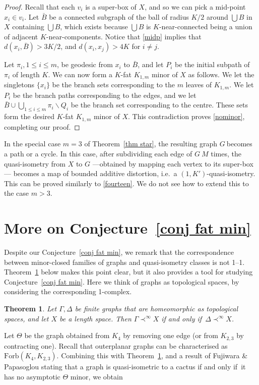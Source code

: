 \documentclass[a4paper]{article}
\newtheorem{theorem}[proposition]{Theorem}
\newcommand{\sm}{\backslash}
\newcommand{\g}{\ensuremath{G\ }}
\newcommand{\Tr}[1]{Theorem~\ref{#1}}
\newcommand{\Cnr}[1]{Con\-jecture~\ref{#1}}
\renewcommand{\iff}{if and only if}
\newcommand{\asm}[2]{\ensuremath{#1 \prec^\infty #2}}
\begin{document}
\begin{proof}
Recall that each $v_i$ is a super-box of $X$, and so we can pick a mid-point $x_i\in v_i$. Let $\bar{B}$ be a connected subgraph of the ball of radius $K/2$ around $\bigcup B$ in $X$ containing $\bigcup B$, which exists because $\bigcup B$ is $K$-near-connected being a union of adjacent $K$-near-components. Notice that \eqref{midp} implies that $d(x_i,\bar{B})>3K/2$, and  $d(x_i,x_j)>4K$ for $i\neq j$.

Let $\pi_i, 1 \leq i \leq m$, be geodesic from $x_i$ to $\bar{B}$, and let $P_i$ be the initial subpath of $\pi_i$ of length $K$. We can now form a $K$-fat $K_{1,m}$ minor of $X$ as follows. We let the singletons $\{x_i\}$ be the  branch sets corresponding to the $m$ leaves of $K_{1,m}$. We let $P_i$ be the branch paths corresponding to the edges, and we let $\bar{B} \cup \bigcup_{1\leq i \leq m} \pi_i \sm Q_i$ be the branch set corresponding to the centre.  These sets form the desired $K$-fat $K_{1,m}$ minor of $X$. This contradiction proves \eqref{nominor}, completing our proof.
\end{proof}

 In the special case $m=3$ of \Tr{thm star}, the resulting graph \g becomes a path or a cycle. In this case, after subdividing each edge of \g $M$ times, the quasi-isometry from $X$ to $G$ ---obtained by mapping each vertex to its super-box--- becomes a map of bounded additive distortion, i.e.\ a $(1,K')$-quasi-isometry. This can be proved similarly to \eqref{fourteen}. We do not see how to extend this to the case $m>3$.

\section{More on \Cnr{conj fat min}} \label{sec homeo}

Despite our \Cnr{conj fat min}, we remark that the correspondence between minor-closed families of graphs and quasi-isometry classes is not 1--1. \Tr{thm subdiv} below makes this point clear, but it also provides a tool for studying \Cnr{conj fat min}. Here we think of graphs as topological spaces, by considering the corresponding  1-complex.

\begin{theorem} \label{thm subdiv}
Let $\Gamma,\Delta$ be finite graphs that are homeomorphic as topological spaces, and let $X$ be a length space. Then  \asm{\Gamma}{X} \iff\ \asm{\Delta}{X}. 
\end{theorem}

 
Let  $\Theta$ be the graph obtained from $K_4$ by removing one edge (or from $K_{2,3}$ by contracting one). Recall that outerplanar graphs can be characterised as $\mathrm{Forb}(K_4, K_{2,3})$. Combining this with  \Tr{thm subdiv}, and a result of Fujiwara \& Papasoglou \cite{FujPapCoa} stating that a graph is quasi-isometric to a cactus \iff\ it has no asymptotic $\Theta$ minor, we obtain
\end{document}
